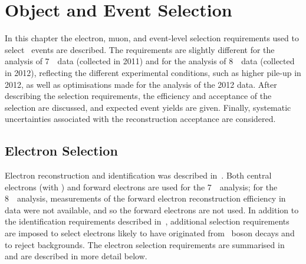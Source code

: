 \graphicspath{{Chapters/ObjEventSelection/Figures/}}
\chapter{Object and Event Selection}
\label{chap:ObjEventSelection}

In this chapter the electron, muon, and event-level selection requirements used
to select \ZZ\ events are described. 
The requirements are
slightly different for the analysis of 7~\tev\ data (collected in 2011) and for
the analysis of 8~\tev\ data (collected in 2012),
reflecting the different experimental conditions, such as higher pile-up in
2012, as well as optimisations made for the analysis of the 2012 data. After
describing the selection requirements, the efficiency and acceptance of the
selection are discussed, and expected event yields are given. Finally, systematic
uncertainties associated with the reconstruction acceptance are considered.

\section{Electron Selection}
\label{sec:objsel-el}

Electron reconstruction and identification was described in~. Both
central electrons 
(with ) 
and forward electrons are used for the 7~\tev\ analysis; for the 8~\tev\
analysis,
measurements of the forward electron reconstruction efficiency in data were
not available, and so the forward electrons are not used. In
addition to the identification requirements described in~,
additional selection requirements are imposed to select electrons likely to have
originated from \Z\ boson decays and to reject backgrounds. 
The electron selection requirements
are summarised in~ and are described in more detail below. 


